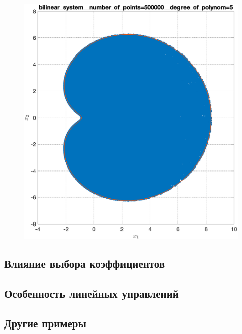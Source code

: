 \documentclass[../main.tex]{subfiles}
\begin{document}
\begin{figure}[ht!]
\begin{minipage}[b]{.49\linewidth}
  	\end{minipage}
  	\hfill
  	\begin{minipage}[b]{.49\linewidth} 
  		\small
  		\centering
  		\includegraphics[width=\linewidth]{images/bilinear_system__number_of_points=500000__degree_of_polynom=5.eps}
  	\end{minipage} 
  \end{figure}
  \subsection{Влияние выбора коэффициентов }
  \subsection{Особенность линейных управлений}
  \subsection{Другие примеры}
  
\end{document}
